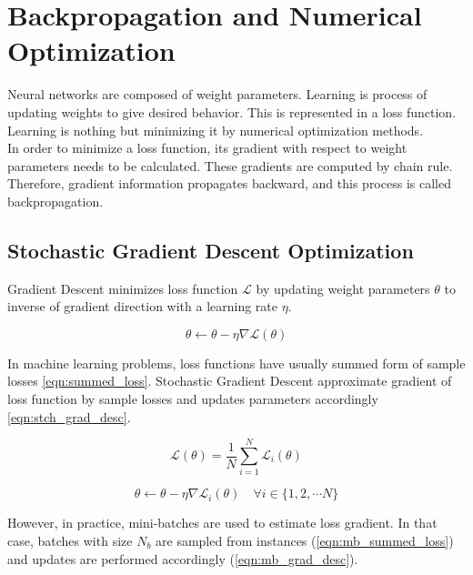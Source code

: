 \section{Backpropagation and Numerical Optimization}
Neural networks are composed of weight parameters. Learning is process of updating weights to give desired behavior. This is represented in a loss function. Learning is nothing but minimizing it by numerical optimization methods. \\

In order to minimize a loss function, its gradient with respect to weight parameters needs to be calculated. These gradients are computed by chain rule. Therefore, gradient information propagates backward, and this process is called backpropagation. 

\subsection{Stochastic Gradient Descent Optimization}

Gradient Descent minimizes loss function $\mathcal{L}$ by updating weight parameters $\theta$ to inverse of gradient direction with a learning rate $\eta$. 

\begin{equation}
\label{eq: grad_desc}
\theta \leftarrow \theta - \eta \nabla \mathcal{L}(\theta)
\end{equation}

In machine learning problems, loss functions have usually summed form of sample losses \eqref{eqn:summed_loss}. Stochastic Gradient Descent approximate gradient of loss function by sample losses and updates parameters accordingly \eqref{eqn:stch_grad_desc}. 

\begin{equation}
\label{eqn:summed_loss}
\mathcal{L}(\theta) = \frac{1}{N} \sum_{i=1}^{N} \mathcal{L}_i(\theta)
\end{equation}

\begin{equation}
\label{eqn:stch_grad_desc}
\theta \leftarrow \theta - \eta \nabla \mathcal{L}_i(\theta) \quad \forall i \in \{1,2, \cdots N\}
\end{equation}

However, in practice, mini-batches are used to estimate loss gradient. In that case, batches with size $N_b$ are sampled from instances (\eqref{eqn:mb_summed_loss}) and updates are performed accordingly (\eqref{eqn:mb_grad_desc}).

